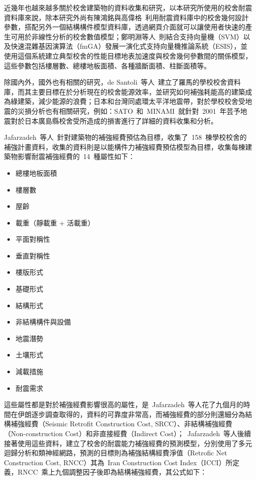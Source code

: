 近幾年也越來越多關於校舍建築物的資料收集和研究，以本研究所使用的校舍耐震資料庫來說，除本研究外尚有陳鴻銘與高偉格\cite{chen2008computer}~利用耐震資料庫中的校舍幾何設計參數，搭配另外一個結構構件模型資料庫，透過網頁介面就可以讓使用者快速的產生可用於非線性分析的校舍數值模型；鄭明淵等人\cite{chen2012seismic}~則結合支持向量機（SVM）以及快速混雜基因演算法（fmGA）發展一演化式支持向量機推論系統（ESIS），並使用這個系統建立典型校舍的性能目標地表加速度與校舍幾何參數間的關係模型，這些參數包括樓層數、總樓地板面積、各種牆斷面積、柱斷面積等。

除國內外，國外也有相關的研究，de Santoli~等人\cite{de2014energy}~建立了羅馬的學校校舍資料庫，而其主要目標在於分析現在的校舍能源效率，並研究如何補強耗能高的建築成為綠建築，減少能源的浪費；日本和台灣同處環太平洋地震帶，對於學校校舍受地震的災損分析也有相關研究，例如：SATO~和~MINAMI\cite{SATOShinji:2004-12}~就針對~2001~年芸予地震對於日本廣島縣校舍受所造成的損害進行了詳細的資料收集和分析。

Jafarzadeh~等人\cite{jafarzadeh2014seismic}~針對建築物的補強經費預估為目標，收集了~158~棟學校校舍的補強計畫資料，收集的資料則是以能構件力補強經費預估模型為目標，收集每棟建築物影響耐震補強經費的~14~種屬性如下：

  \begin{multicols}{2}
  \begin{itemize}
  \item 總樓地板面積
  \item 樓層數
  \item 屋齡
  \item 載重（靜載重 + 活載重）
  \item 平面對稱性
  \item 垂直對稱性
  \item 樓版形式
  \item 基礎形式
  \item 結構形式
  \item 非結構構件與設備
  \item 地震潛勢
  \item 土壤形式
  \item 減載措施
  \item 耐震需求
  \end{itemize}
  \end{multicols}

這些屬性都是對於補強經費影響很高的屬性\cite{jafarzadeh2012seismic}，是~Jafarzadeh~等人花了九個月的時間在伊朗逐步調查取得的，資料的可靠度非常高，而補強經費的部分則還細分為結構補強經費（Seismic Retrofit Construction Cost, SRCC）、非結構補強經費（Non-construction Cost）和非直接經費（Indirect Cost）；~Jafarzadeh~等人後續接著使用這些資料，建立了校舍的耐震能力補強經費的預測模型，分別使用了多元迴歸分析\cite{jafarzadeh2013predicting}和類神經網路\cite{jafarzadeh2013application}，預測的目標則為補強結構經費淨值（Retrofic Net Construction Cost, RNCC）其為~Iran Construction Cost Index（ICCI）所定義，RNCC~乘上九個調整因子後即為結構補強經費，其公式如下：

